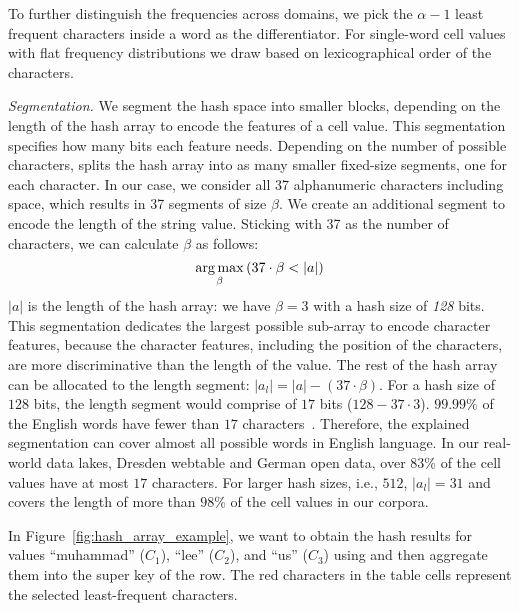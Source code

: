 To further distinguish the frequencies across domains, we pick the $\alpha-1$ least frequent characters inside a word as the differentiator. For single-word cell values with flat frequency distributions we draw based on lexicographical order of the characters.

\noindent\textit{Segmentation.}
We segment the hash space into smaller blocks, depending on the length of the hash array to encode the features of a cell value.
This segmentation specifies how many bits each feature needs. 
Depending on the number of possible characters, \hash splits the hash array into as many smaller fixed-size segments, one for each character. 
In our case, we consider all 37 alphanumeric characters including space, which results in 37 segments of size $\beta$.
We create an additional segment to encode the length of the string value.
Sticking with 37 as the number of characters, we can calculate $\beta$ as follows:
\begin{equation}
\small
    \operatorname*{arg\,max}_{\beta} {(37 \cdot \beta < |a|)}
\end{equation}
$|a|$ is the length of the hash array: we have $\beta=3$ with a hash size of \textit{128} bits.
This segmentation dedicates the largest possible sub-array to encode character features, because the character features, including the position of the characters, are more discriminative than the length of the value.
The rest of the hash array can be allocated to the length segment: $|a_l| = |a| - (37 \cdot \beta)$.
For a hash size of $128$ bits, the length segment would comprise of $17$ bits ($128 - 37 \cdot 3$). 
$99.99\%$ of the English words have fewer than $17$ characters~\cite{mayzner1965tables}. Therefore, the explained segmentation can cover almost all possible words in English language. In our real-world data lakes, Dresden webtable and German open data, over $83\%$ of the cell values have at most $17$ characters. For larger hash sizes, i.e., $512$, $|a_l|=31$  and covers the length of more than $98\%$ of the cell values in our corpora.

In Figure~\ref{fig:hash_array_example}, we want to obtain the hash results for values ``muhammad'' ($C_1$), ``lee'' ($C_2$), and ``us'' ($C_3$) using \hash and then aggregate them into the super key of the row. The red characters in the table cells represent the selected least-frequent characters.

